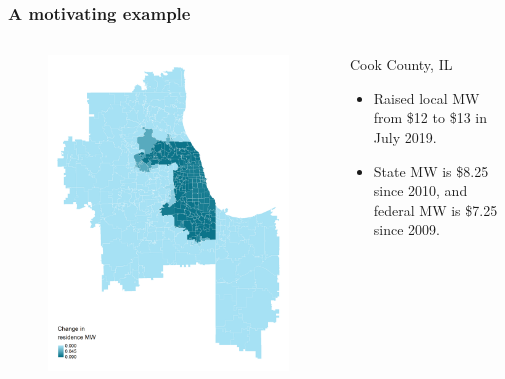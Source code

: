 \documentclass[aspectratio=169, t]{beamer}
\begin{document}
\begin{frame}
    \frametitle{A motivating example}
    \begin{columns}
        \begin{column}{0.44\textwidth}
            \vspace{-8mm}
            \begin{figure}
                \centering
                \includegraphics[scale = 0.38]{maps_events/output/chicago_2019-6_statutory_mw.png}
            \end{figure}   
        \end{column}
        \begin{column}{0.56\textwidth}
            Cook County, IL
            \begin{itemize}
                \item Raised local MW from \$12 to \$13 in July 2019. 
                \item State MW is \$8.25 since 2010, and federal MW is \$7.25 since 2009.

\end{itemize}
\end{column}
\end{columns}
\end{frame}
\end{document}
